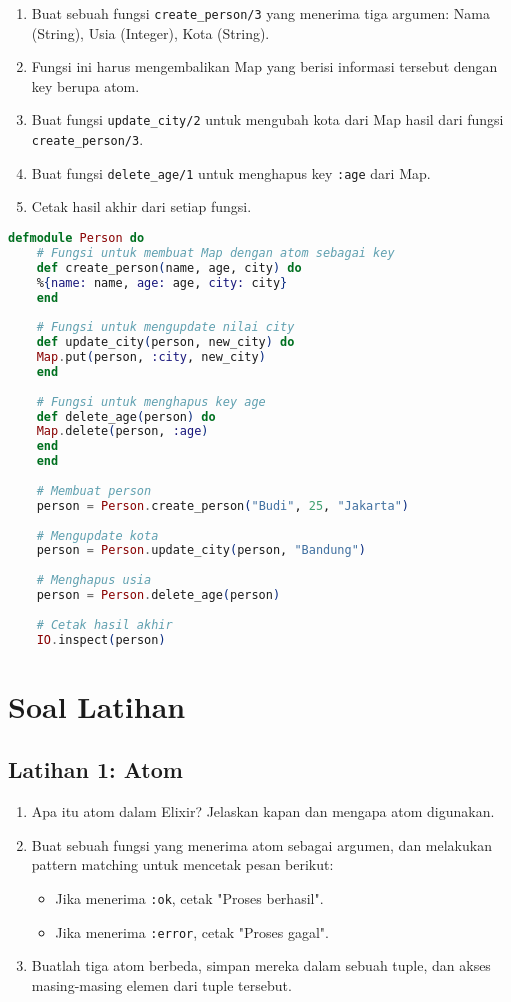 \begin{enumerate}
	\item Buat sebuah fungsi \texttt{create\_person/3} yang menerima tiga argumen: Nama (String), Usia (Integer), Kota (String).
	\item Fungsi ini harus mengembalikan Map yang berisi informasi tersebut dengan key berupa atom.
	\item Buat fungsi \texttt{update\_city/2} untuk mengubah kota dari Map hasil dari fungsi \texttt{create\_person/3}.
	\item Buat fungsi \texttt{delete\_age/1} untuk menghapus key \texttt{:age} dari Map.
	\item Cetak hasil akhir dari setiap fungsi.
\end{enumerate}

\begin{lstlisting}[language=Elixir]
	defmodule Person do
	# Fungsi untuk membuat Map dengan atom sebagai key
	def create_person(name, age, city) do
	%{name: name, age: age, city: city}
	end
	
	# Fungsi untuk mengupdate nilai city
	def update_city(person, new_city) do
	Map.put(person, :city, new_city)
	end
	
	# Fungsi untuk menghapus key age
	def delete_age(person) do
	Map.delete(person, :age)
	end
	end
	
	# Membuat person
	person = Person.create_person("Budi", 25, "Jakarta")
	
	# Mengupdate kota
	person = Person.update_city(person, "Bandung")
	
	# Menghapus usia
	person = Person.delete_age(person)
	
	# Cetak hasil akhir
	IO.inspect(person)
\end{lstlisting}

\section{Soal Latihan}

\subsection{Latihan 1: Atom}
\begin{enumerate}
	\item Apa itu atom dalam Elixir? Jelaskan kapan dan mengapa atom digunakan.
	\item Buat sebuah fungsi yang menerima atom sebagai argumen, dan melakukan pattern matching untuk mencetak pesan berikut:
	\begin{itemize}
		\item Jika menerima \texttt{:ok}, cetak "Proses berhasil".
		\item Jika menerima \texttt{:error}, cetak "Proses gagal".
	\end{itemize}
	\item Buatlah tiga atom berbeda, simpan mereka dalam sebuah tuple, dan akses masing-masing elemen dari tuple tersebut.
\end{enumerate}

